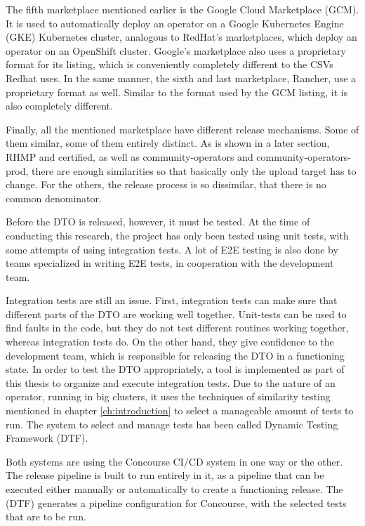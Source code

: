 The fifth marketplace mentioned earlier is the Google Cloud Marketplace (GCM).
It is used to automatically deploy an operator on a Google Kubernetes Engine (GKE) Kubernetes cluster, analogous to RedHat's marketplaces, which deploy an operator on an OpenShift cluster.
Google's marketplace also uses a proprietary format for its listing, which is conveniently completely different to the CSVs Redhat uses.
In the same manner, the sixth and last marketplace, Rancher, use a proprietary format as well.
Similar to the format used by the GCM listing, it is also completely different.

Finally, all the mentioned marketplace have different release mechanisms.
Some of them similar, some of them entirely distinct.
As is shown in a later section, RHMP and certified, as well as community-operators and community-operators-prod, there are enough similarities so that basically only the upload target has to change.
For the others, the release process is so dissimilar, that there is no common denominator.

Before the DTO is released, however, it must be tested.
At the time of conducting this research, the project has only been tested using unit tests, with some attempts of using integration tests.
A lot of E2E testing is also done by teams specialized in writing E2E tests, in cooperation with the development team.

Integration tests are still an issue.
First, integration tests can make sure that different parts of the DTO are working well together.
Unit-tests can be used to find faults in the code, but they do not test different routines working together, whereas integration tests do.
On the other hand, they give confidence to the development team, which is responsible for releasing the DTO in a functioning state.
In order to test the DTO appropriately, a tool is implemented as part of this thesis to organize and execute integration tests.
Due to the nature of an operator, running in big clusters, it uses the techniques of similarity testing mentioned in chapter \ref{ch:introduction} to select a manageable amount of tests to run.
The system to select and manage tests has been called Dynamic Testing Framework (DTF).

Both systems are using the Concourse CI/CD system in one way or the other.
The release pipeline is built to run entirely in it, as a pipeline that can be executed either manually or automatically to create a functioning release.
The (DTF) generates a pipeline configuration for Concourse, with the selected tests that are to be run.
